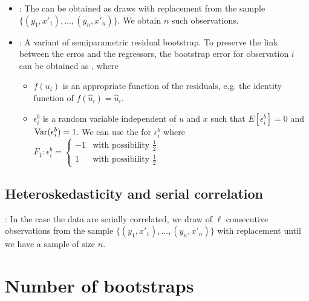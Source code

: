 \begin{itemize}
    \item {}: The  can be obtained as draws with replacement from the sample $\{(y_1,x'_1),\ldots,(y_n,x'_n)\}$.
    We obtain $n$ such observations.
    \item {}: A variant of semiparametric residual bootstrap.
    To preserve the link between the erros and the regressors, the bootstrap error for observation $i$ can be obtained as , where 
    \begin{itemize}
        \item $f(u_i)$ is an appropriate function of the residuals, e.g. the identity function of $f(\hat{u}_i) = \hat{u}_i$.
        \item $\epsilon_i^b$ is a random variable independent of $u$ and $x$ such that $E[\epsilon_i^b] = 0$ and $\operatorname{Var}(\epsilon_i^b)=1$.
        We can use the  for $\epsilon_i^b$ where $F_1 : \epsilon_i^b = \begin{cases}
            -1  &\text{with possibility } \frac{1}{2}\\
            1  &\text{with possibility } \frac{1}{2}
        \end{cases}$
    \end{itemize}
\end{itemize}

\subsection{Heteroskedasticity and serial correlation}

: In the case the data are serially correlated, we draw  of $\ell$ consecutive observations from the sample $\{(y_1,x'_1),\ldots,(y_n,x'_n)\}$ with replacement until we have a sample of size $n$.

\section{Number of bootstraps}


